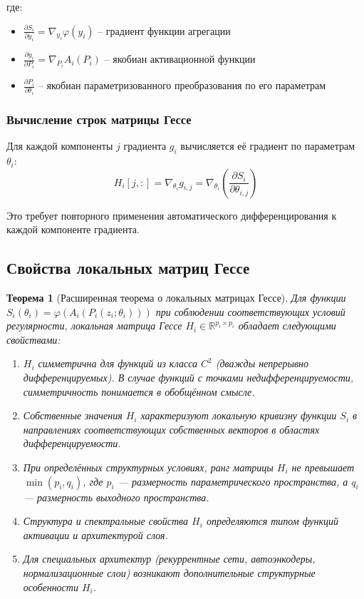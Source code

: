 \documentclass[a4paper,12pt]{article}
\newtheorem{theorem}{Теорема}
\begin{document}
где:
\begin{itemize}
\item $\frac{\partial S_i}{\partial y_i} = \nabla_{y_i} \varphi(y_i)$ -- градиент функции агрегации
\item $\frac{\partial y_i}{\partial P_i} = \nabla_{P_i} A_i(P_i)$ -- якобиан активационной функции
\item $\frac{\partial P_i}{\partial \theta_i}$ -- якобиан параметризованного преобразования по его параметрам
\end{itemize}

\subsubsection{Вычисление строк матрицы Гессе}
Для каждой компоненты $j$ градиента $g_i$ вычисляется её градиент по параметрам $\theta_i$:
\begin{equation}
    H_i[j,:] = \nabla_{\theta_i} g_{i,j} = \nabla_{\theta_i} \left( \frac{\partial S_i}{\partial \theta_{i,j}} \right)
\end{equation}

Это требует повторного применения автоматического дифференцирования к каждой компоненте градиента.

\subsection{Свойства локальных матриц Гессе}

\begin{theorem}[Расширенная теорема о локальных матрицах Гессе]
    Для функции $S_i(\theta_i) = \varphi(A_i(P_i(z_i; \theta_i)))$ при соблюдении соответствующих условий регулярности, локальная матрица Гессе $H_i \in \mathbb{R}^{p_i \times p_i}$ обладает следующими свойствами:
    \begin{enumerate}
    \item $H_i$ симметрична для функций из класса $C^2$ (дважды непрерывно дифференцируемых). В случае функций с точками недифференцируемости, симметричность понимается в обобщённом смысле.
    \item Собственные значения $H_i$ характеризуют локальную кривизну функции $S_i$ в направлениях соответствующих собственных векторов в областях дифференцируемости.
    \item При определённых структурных условиях, ранг матрицы $H_i$ не превышает $\min(p_i, q_i)$, где $p_i$ — размерность параметрического пространства, а $q_i$ — размерность выходного пространства.
    \item Структура и спектральные свойства $H_i$ определяются типом функций активации и архитектурой слоя.
    \item Для специальных архитектур (рекуррентные сети, автоэнкодеры, нормализационные слои) возникают дополнительные структурные особенности $H_i$.
    \end{enumerate}
    \end{theorem}
    
\end{document}
